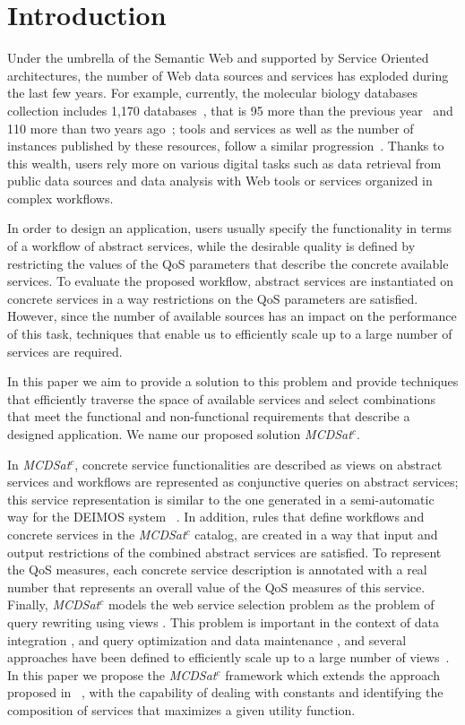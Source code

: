 \documentclass{llncs}
\begin{document}
\section{Introduction}
Under the umbrella of the Semantic Web and supported by Service Oriented architectures, the number of Web data sources and services has exploded during the last few years.  For example,  currently, the molecular biology databases
collection includes 1,170 databases~\cite{Galperin09}, that is
95 more than the previous year~\cite{Galperin2008} and 110 more than two years ago~\cite{Galperin2007};  tools
and services as well as the number of instances published by these resources, follow a similar progression~\cite{Benson07}. Thanks
to this wealth, users rely more on various
digital tasks such as data retrieval from public data sources and
data analysis with Web tools or services organized in
complex workflows.  

In order to design an application, users usually specify the functionality in terms of a workflow of abstract services, while the desirable quality  is defined by restricting the values of the QoS parameters that describe the concrete available services. To evaluate the proposed workflow,  abstract services are instantiated on concrete services in a way restrictions on the QoS parameters are satisfied.  However, since the number of available sources has an impact on the performance of this task, techniques that enable us to efficiently scale up to a large number of services are required. 

In this paper we aim to provide a solution to this problem and provide techniques that efficiently traverse the space of available services and select combinations that meet the functional and non-functional requirements that describe a designed application.  We name our proposed solution {\it MCDSat}$^c$. 

In {\it MCDSat}$^c$, concrete service functionalities are described as views on abstract services and workflows are represented as conjunctive queries on abstract services; this service representation is similar to the one generated in a semi-automatic way for the {\cal DEIMOS} system ~\cite{AmbiteISWC09}.  In addition, rules that define workflows and  concrete services in the {\it MCDSat}$^c$ catalog,  are created in a way that input and output restrictions of the combined abstract services are satisfied. To represent the QoS measures, each concrete service description is annotated with a real number that represents an overall value of the QoS measures of this service.  Finally, {\it MCDSat}$^c$ models the web service selection problem as the problem of query rewriting using views \cite{halevy:survey}. This problem is important in the context of data integration
\cite{Chen05,JaudoinPRST05}, and query optimization and data maintenance \cite{AfratiLU07,levy:bucket}, and several approaches have been defined to efficiently scale up to a large number of views~\cite{arvelo:aaai06,pods:DuschkaG97,sac:DuschkaG97,levy:bucket,pottinger:minicon}. In this paper we propose the {\it MCDSat}$^c$ framework which extends the approach proposed in ~\cite{arvelo:aaai06},  with the capability of dealing with constants and identifying the composition of services that maximizes a given utility function. 
\end{document}

